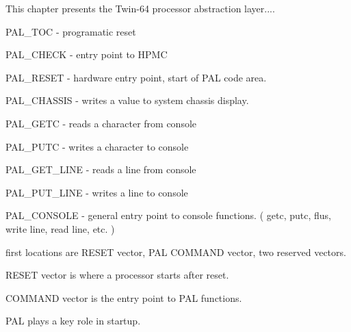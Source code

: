 This chapter presents the Twin-64 processor abstraction layer....







PAL\_TOC - programatic reset

PAL\_CHECK - entry point to HPMC

PAL\_RESET - hardware entry point, start of PAL code area.

PAL\_CHASSIS - writes a value to system chassis display.

PAL\_GETC - reads a character from console

PAL\_PUTC - writes a character to console

PAL\_GET\_LINE - reads a line from console

PAL\_PUT\_LINE - writes a line to console

PAL\_CONSOLE - general entry point to console functions. ( getc, putc, flus, write line, read line, etc. )



first locations are RESET vector, PAL COMMAND vector, two reserved vectors.

RESET vector is where a processor starts after reset.

COMMAND vector is the entry point to PAL functions.




PAL plays a key role in startup.


